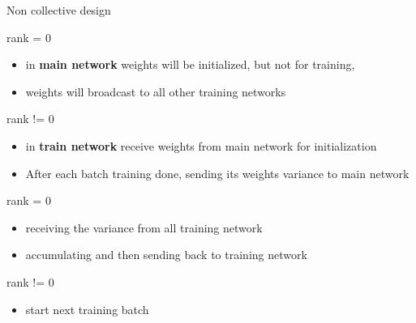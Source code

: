 \documentclass[presentation]{beamer}
\begin{document}
\begin{frame}[label={sec:orge9806fb}]{Non collective design}
\begin{block}{rank = 0}
\begin{itemize}
\item in \textbf{main network} weights will be initialized, but not for training,
\item weights will broadcast to all other training networks
\end{itemize}
\end{block}
\begin{block}{rank != 0}
\begin{itemize}
\item in \textbf{train network} receive weights from main network for initialization
\item After each batch training done, sending its weights variance to main network
\end{itemize}
\end{block}
\begin{block}{rank = 0}
\begin{itemize}
\item receiving the  variance from all training network
\item accumulating and then sending back to training network
\end{itemize}
\end{block}
\begin{block}{rank != 0}
\begin{itemize}
\item start next training batch
\end{itemize}
\end{block}
\end{frame}
\end{document}
